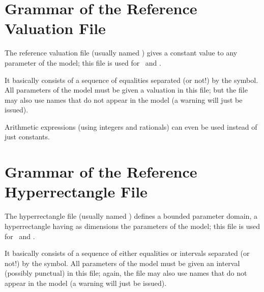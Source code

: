 


\section{Grammar of the Reference Valuation File}

The reference valuation file (usually named ) gives a constant value to any parameter of the model;
this file is used for~\IM{} and \PRP{}.

It basically consists of a sequence of equalities  separated (or not!) by the \styleIMI{\&} symbol.
All parameters of the model must be given a valuation in this file; but the file may also use names that do not appear in the model (a warning will just be issued).

Arithmetic expressions (using integers and rationals) can even be used instead of just constants.



\section{Grammar of the Reference Hyperrectangle File}

The hyperrectangle file (usually named ) defines a bounded parameter domain, \ie{} a hyperrectangle having as dimensions the parameters of the model;
this file is used for~\BC{} and \PRPC{}.

It basically consists of a sequence of either equalities  or intervals  separated (or not!) by the \styleIMI{\&} symbol.
All parameters of the model must be given an interval (possibly punctual) in this file; again, the file may also use names that do not appear in the model (a warning will just be issued).

